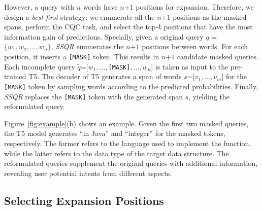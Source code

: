 \documentclass[sigconf,screen]{acmart}
\newcommand{\ourmethod}{\textit{SSQR}\xspace}
\begin{document}
However, a query with $n$ words have $n$+$1$ positions for expansion. Therefore, we design a \textit{best-first} strategy: we enumerate all the $n$+$1$ positions as the masked spans, perform the CQC task, and select the top-\textit{k} positions that have the most information gain of predictions.
Specially, given a original query $q$ =$\{w_1,w_2,...,w_n\}$, \ourmethod enumerates the $n$+$1$ positions between words. For each position, it inserts a \texttt{[MASK]} token. This results in $n$+$1$ candidate masked queries. 
Each incomplete query $\tilde{q}$=[$w_1,\ldots,$\verb|[MASK]|$,\ldots,w_n$] is taken as input to the pre-trained T5.
The decoder of T5 generates a span of words $s$=[$v_1,\ldots,v_m$] for the \verb|[MASK]| token by sampling words according to the predicted probabilities. 
Finally, \ourmethod replaces the \verb|[MASK]| token with the generated span $s$, yielding the reformulated query.

Figure~\ref{fig:example}(b) shows an example. Given the first two masked queries, the T5 model generates ``in Java'' and ``integer'' for the masked tokens, respectively.
The former refers to the language used to implement the function, while the latter refers to the data type of the target data structure. The reformulated queries supplement the original queries with additional information, revealing user potential intents from different aspects. %


\subsection{Selecting Expansion Positions} 
\label{ss:approach:selection}
\end{document}
